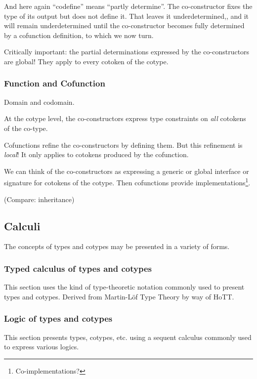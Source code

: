 \documentclass{article}
\begin{document}
And here again ``codefine'' means ``partly determine''. The
co-constructor fixes the type of its output but does not define it.
That leaves it underdetermined,, and it will remain underdetermined
until the co-constructor becomes fully determined by a cofunction
definition, to which we now turn.

Critically important: the partial determinations expressed by the
co-constructors are global! They apply to every cotoken of the cotype.

\subsubsection{Function and Cofunction}

Domain and codomain.

At the cotype level, the co-constructors express type constraints on
\textit{all} cotokens of the co-type.

Cofunctions refine the co-constructors by defining them. But this
refinement is \textit\textit{local}! It only applies to cotokens
produced by the cofunction.

We can think of the co-constructors as expressing a generic or global
interface or signature for cotokens of the cotype. Then cofunctions
provide implementations\footnote{Co-implementations?}.

(Compare: inheritance)


\subsection{Calculi}
The concepts of types and cotypes may be presented in a variety of forms.

\subsubsection{Typed calculus of types and cotypes}

This section uses the kind of type-theoretic notation commonly used to
present types and cotypes. Derived from Martin-Löf Type Theory by way
of HoTT.

\subsubsection{Logic of types and cotypes}

This section presents types, cotypes, etc. using a sequent calculus
commonly used to express various logics.
\end{document}
